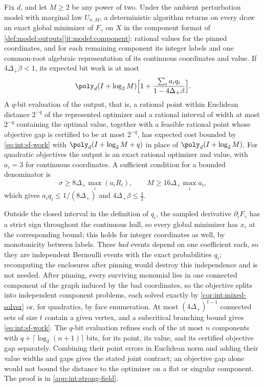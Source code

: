 \begin{theorem}\label{thm:int:strong-field}
Fix $d$, and let $M\ge2$ be any power of two. Under the ambient perturbation
model with marginal law $U_{\sigma,M}$, a deterministic algorithm returns on
every draw an exact global minimizer of $F_\gamma$ on $X$ in the component
format of \cref{def:model:outputs}\ref{it:model:component}: rational values
for the pinned coordinates, and for each remaining component its integer labels
and one common-root algebraic representation of its continuous coordinates and
value. If $4\Delta_+\beta<1$, its expected bit work is at most
\begin{equation}\label{eq:int:sf-work}
 \poly_d(I+\log_2M)\Bigl[1+\frac{\sum_ia_iq_i}{1-4\Delta_+\beta}\Bigr].
\end{equation}
A $q$-bit evaluation of the output, that is, a rational point within
Euclidean distance $2^{-q}$ of the represented optimizer and a rational
interval of width at most $2^{-q}$ containing the optimal value, together with
a feasible rational point whose objective gap is certified to be at most
$2^{-q}$, has expected cost bounded by \eqref{eq:int:sf-work} with
$\poly_d(I+\log_2M+q)$ in place of $\poly_d(I+\log_2M)$. For quadratic
objectives the output is an exact rational optimizer and value, with $a_i=3$
for continuous coordinates. A sufficient condition for a bounded denominator
is
\begin{equation}\label{eq:int:sf-regime}
 \sigma\ge8\Delta_+\max_i(a_iR_i),\qquad M\ge16\Delta_+\max_ia_i,
\end{equation}
which gives $a_iq_i\le1/(8\Delta_+)$ and $4\Delta_+\beta\le\frac12$.
\end{theorem}

Outside the closed interval in the definition of $q_i$, the sampled
derivative $\partial_iF_\gamma$ has a strict sign throughout the continuous
hull, so every global minimizer has $x_i$ at the corresponding bound; this
holds for integer coordinates as well, by monotonicity between labels. These
\emph{bad} events depend on one coefficient each, so they are independent
Bernoulli events with the exact probabilities $q_i$; recomputing the
enclosures after pinning would destroy this independence and is not needed.
After pinning, every surviving monomial lies in one connected component of the
graph induced by the bad coordinates, so the objective splits into independent
component problems, each solved exactly by \cref{cor:int:mixed-solver} or, for
quadratics, by face enumeration. At most $(4\Delta_+)^{t-1}$ connected sets of
size $t$ contain a given vertex, and a subcritical branching bound gives
\eqref{eq:int:sf-work}. The $q$-bit evaluation refines each of the at most $n$
components with $q+\lceil\log_2(n+1)\rceil$ bits, for its point, its value,
and its certified objective gap separately. Combining their point errors
in Euclidean norm and adding their value widths and gaps gives the stated
joint contract; an objective gap alone would not bound the distance to the
optimizer on a flat or singular component. The proof is in
\cref{app:int:strong-field}.

